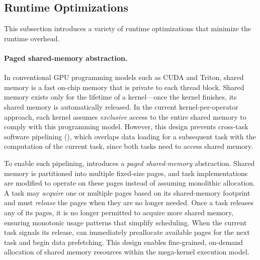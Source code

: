 \subsection{Runtime Optimizations}
\label{subsec:runtime_optimizations}
This subsection introduces a variety of runtime optimizations that minimize the \sys runtime overhead.

\paragraph{Paged shared-memory abstraction.}
In conventional GPU programming models such as CUDA and Triton, shared memory is a fast on-chip memory that is private to each thread block. Shared memory exists only for the lifetime of a kernel---once the kernel finishes, its shared memory is automatically released. In the current kernel-per-operator approach, each kernel assumes {\em exclusive} access to the entire shared memory to comply with this programming model.
%
However, this design prevents cross-task software pipelining (), which overlaps data loading for a subsequent task with the computation of the current task, since both tasks need to access shared memory.

To enable such pipelining, \Sys introduces a {\em paged shared-memory} abstraction. Shared memory is partitioned into multiple fixed-size pages, and task implementations are modified to operate on these pages instead of assuming monolithic allocation. A task may {\em acquire} one or multiple pages based on its shared-memory footprint and must {\em release} the pages when they are no longer needed. Once a task releases any of its pages, it is no longer permitted to acquire more shared memory, ensuring monotonic usage patterns that simplify scheduling. When the current task signals its release, \sys can immediately preallocate available pages for the next task and begin data prefetching. This design enables fine-grained, on-demand allocation of shared memory resources within the mega-kernel execution model.


